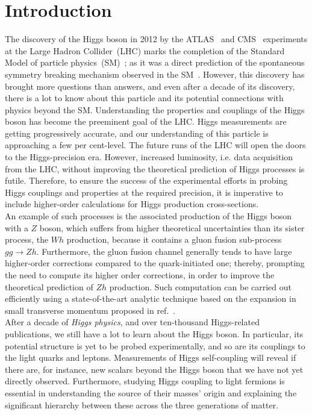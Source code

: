 

\chapter{Introduction}
The discovery of the Higgs boson in 2012 by the ATLAS~\cite{ATLAS:2012yve}  and CMS~\cite{CMS:2012qbp} experiments at the {L}arge {H}adron {C}ollider~(LHC) marks the completion of the Standard Model of particle physics~(SM)~\cite{salam1,salam2,PhysRevLett.19.1264}; as it was a direct prediction of the spontaneous symmetry breaking mechanism observed in the SM~\cite{PhysRevLett.13.321,PhysRevLett.13.508,HIGGS1964132,PhysRevLett.13.585,Guralnik:2009jd}. However, this discovery has brought more questions than answers, and even after a decade of its discovery, there is a lot to know about this particle and its potential connections with physics beyond the SM.
%
Understanding the properties and couplings of the Higgs boson has become the preeminent goal of the LHC. Higgs measurements are getting progressively accurate, and our understanding of this particle is approaching a few per cent-level. The future runs of the LHC will open the doors to the Higgs-precision era. However, increased luminosity, i.e. data acquisition from the LHC, without improving the theoretical prediction of Higgs processes is futile. Therefore, to ensure the success of the experimental efforts in probing Higgs couplings and properties at the required precision, it is imperative to include higher-order calculations for Higgs production cross-sections. \\ 
An example of such processes is the associated production of the Higgs boson with a $Z$ boson, which suffers from higher theoretical uncertainties than its sister process, the $Wh$ production, because it contains a gluon fusion sub-process $ gg \to Zh$. Furthermore, the gluon fusion channel generally tends to have large higher-order corrections compared to the quark-initiated one;  thereby, prompting the need to compute its higher order corrections, in order to improve the theoretical prediction of  $Zh$ production. Such computation can be carried out efficiently using a state-of-the-art analytic technique based on the expansion in small transverse momentum proposed in ref.~\cite{Bonciani:2018omm}. 
%
\\ After a decade of \emph{Higgs physics}, and over ten-thousand Higgs-related publications, we still have a lot to learn about the Higgs boson.  In particular, its potential structure is yet to be probed experimentally, and so are its couplings to the light quarks and leptons. Measurements of Higgs self-coupling will reveal if there are, for instance, new scalars beyond the Higgs boson that we have not yet directly observed. Furthermore, studying Higgs coupling to light fermions is essential in understanding the source of their masses' origin and explaining the significant hierarchy between these across the three generations of matter. \\ 
